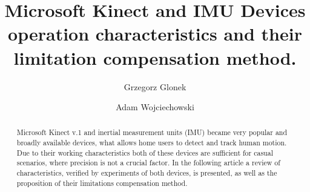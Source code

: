 \documentclass{llncs}
\begin{document}
\title{Microsoft Kinect and IMU Devices operation characteristics and their limitation compensation method.}
	
	
\author{Grzegorz Glonek \and Adam Wojciechowski}
	
	

	
\maketitle            
\begin{abstract}
	Microsoft Kinect v.1 and inertial measurement units (IMU) became very popular and broadly available devices, what allows home users to detect and track human motion. Due to their working characteristics both of these devices are sufficient for casual scenarios, where precision is not a crucial factor. In the following article a review of characteristics, verified by experiments of both devices, is presented, as well as the proposition of their limitations compensation method.
\end{abstract}
	
\end{document}
